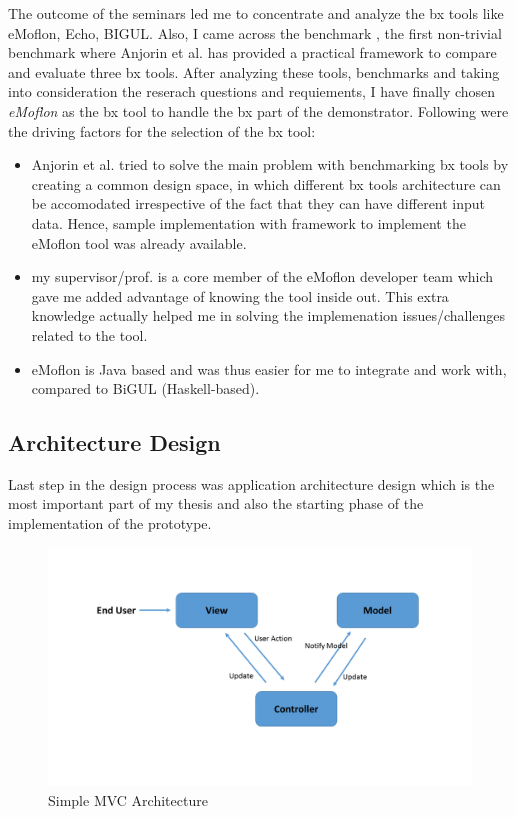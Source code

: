 The outcome of the seminars led me to concentrate and analyze the bx tools like eMoflon, Echo, BIGUL. Also, I came across the benchmark \cite{benchmarx} \cite{benchmarx-reload}, the first non-trivial benchmark where Anjorin et al. has provided a practical framework to compare and evaluate three bx tools. After analyzing these tools, benchmarks and taking into consideration the reserach questions and requiements, I have finally chosen \textit{eMoflon} as the bx tool to handle the bx part of the demonstrator. Following were the driving factors for the selection of the bx tool:
\begin{itemize}
	\item {Anjorin et al. \cite{benchmarx-reload} tried to solve the main problem with benchmarking bx tools by creating a common design space, in which different bx tools architecture can be accomodated irrespective of the fact that they can have different input data. Hence, sample implementation with framework to implement the eMoflon tool was already available.}
	\item {my supervisor/prof. is a core member of the eMoflon developer team which gave me added advantage of knowing the tool inside out. This extra knowledge actually helped me in solving the implemenation issues/challenges related to the tool.}
	\item {eMoflon is Java based and was thus easier for me to integrate and work with, compared to BiGUL (Haskell-based).}
\end{itemize}

\subsection{Architecture Design}\label{subsec:architecturedesign}
Last step in the design process was application architecture design which is the most important part of my thesis and also the starting phase of the implementation of the prototype.

\begin{figure}
	\includegraphics[width=1\textwidth]{figures/MVC}
	\caption{Simple MVC Architecture}
	\label{fig:MVC}
\end{figure}

